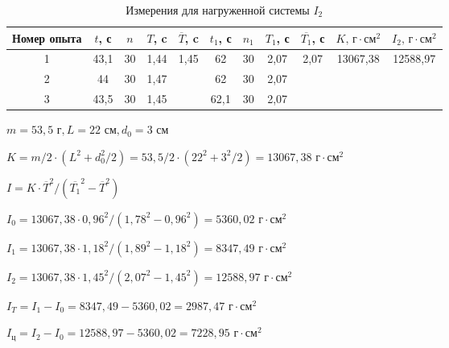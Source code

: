 \begin{table}[ht]
    \centering
    
    \begin{tabular}{|c|c|c|c|c|c|c|c|c|c|c|}
        \hline
        Номер опыта & $t$, с & $n$ & $T$, c &     $\overline{T}$, c      & $t_1$, с & $n_1$ & $T_1$, с & $\overline{T_1}$, с         & $K \text{, г}\cdot\text{см}^2$ & $I_2\text{, г}\cdot\text{см}^2$ \\
        \hline
                  1 &  43,1  & 30  &  1,44  & \multirow{3}{*}{1,45} &   62     &  30   &  2,07     & \multirow{3}{*}{2,07}  &     \multirow{3}{*}{13067,38 }   & \multirow{3}{*}{12588,97}          \\
        \cline{1-4} \cline{6-8}
                  2 &  44    & 30  &  1,47  &                       &   62     &  30   &  2,07     &                        &                                  &                                   \\
        \cline{1-4} \cline{6-8}
                  3 &  43,5  & 30  &  1,45  &                       &   62,1   &  30   &  2,07     &                        &                                  &                                   \\
        \hline
    \end{tabular}

    \caption{Измерения для нагруженной системы $I_2$} \label{table-3}
\end{table}

%

$m = 53,5 \text{ г}, L = 22 \text{ см}, d_0 = 3 \text{ см}$

$K = m / 2 \cdot (L^2 + d_0^2 / 2) = 
53,5 / 2 \cdot (22^2 + 3^2 / 2) = 13067,38 \text{ г} \cdot \text{см}^2$

$I = K \cdot \overline{T}^2 / (\overline{T_1}^2 - \overline{T}^2)$

$I_0 = 13067,38 \cdot 0,96^2 / (1,78^2 - 0,96^2) = 5360,02 \text{ г} \cdot \text{см}^2$

$I_1 = 13067,38 \cdot 1,18^2 / (1,89^2 - 1,18 ^2) = 8347,49 \text{ г} \cdot \text{см}^2$

$I_2 = 13067,38 \cdot 1,45^2 / (2,07^2 - 1,45 ^2) = 12588,97 \text{ г} \cdot \text{см}^2$

$I_T = I_1 - I_0 = 8347,49 - 5360,02 = 2987,47 \text{ г} \cdot \text{см}^2$

$I_{\text{ц}} = I_2 - I_0 = 12588,97 - 5360,02 = 7228,95 \text{ г} \cdot \text{см}^2$

